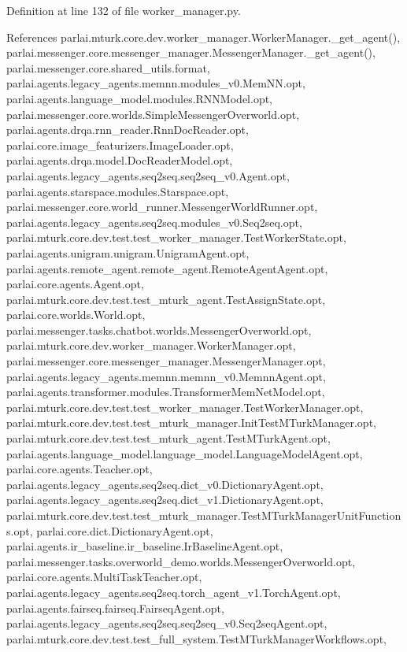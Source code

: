 Definition at line 132 of file worker\+\_\+manager.\+py.



References parlai.\+mturk.\+core.\+dev.\+worker\+\_\+manager.\+Worker\+Manager.\+\_\+get\+\_\+agent(), parlai.\+messenger.\+core.\+messenger\+\_\+manager.\+Messenger\+Manager.\+\_\+get\+\_\+agent(), parlai.\+messenger.\+core.\+shared\+\_\+utils.\+format, parlai.\+agents.\+legacy\+\_\+agents.\+memnn.\+modules\+\_\+v0.\+Mem\+N\+N.\+opt, parlai.\+agents.\+language\+\_\+model.\+modules.\+R\+N\+N\+Model.\+opt, parlai.\+messenger.\+core.\+worlds.\+Simple\+Messenger\+Overworld.\+opt, parlai.\+agents.\+drqa.\+rnn\+\_\+reader.\+Rnn\+Doc\+Reader.\+opt, parlai.\+core.\+image\+\_\+featurizers.\+Image\+Loader.\+opt, parlai.\+agents.\+drqa.\+model.\+Doc\+Reader\+Model.\+opt, parlai.\+agents.\+legacy\+\_\+agents.\+seq2seq.\+seq2seq\+\_\+v0.\+Agent.\+opt, parlai.\+agents.\+starspace.\+modules.\+Starspace.\+opt, parlai.\+messenger.\+core.\+world\+\_\+runner.\+Messenger\+World\+Runner.\+opt, parlai.\+agents.\+legacy\+\_\+agents.\+seq2seq.\+modules\+\_\+v0.\+Seq2seq.\+opt, parlai.\+mturk.\+core.\+dev.\+test.\+test\+\_\+worker\+\_\+manager.\+Test\+Worker\+State.\+opt, parlai.\+agents.\+unigram.\+unigram.\+Unigram\+Agent.\+opt, parlai.\+agents.\+remote\+\_\+agent.\+remote\+\_\+agent.\+Remote\+Agent\+Agent.\+opt, parlai.\+core.\+agents.\+Agent.\+opt, parlai.\+mturk.\+core.\+dev.\+test.\+test\+\_\+mturk\+\_\+agent.\+Test\+Assign\+State.\+opt, parlai.\+core.\+worlds.\+World.\+opt, parlai.\+messenger.\+tasks.\+chatbot.\+worlds.\+Messenger\+Overworld.\+opt, parlai.\+mturk.\+core.\+dev.\+worker\+\_\+manager.\+Worker\+Manager.\+opt, parlai.\+messenger.\+core.\+messenger\+\_\+manager.\+Messenger\+Manager.\+opt, parlai.\+agents.\+legacy\+\_\+agents.\+memnn.\+memnn\+\_\+v0.\+Memnn\+Agent.\+opt, parlai.\+agents.\+transformer.\+modules.\+Transformer\+Mem\+Net\+Model.\+opt, parlai.\+mturk.\+core.\+dev.\+test.\+test\+\_\+worker\+\_\+manager.\+Test\+Worker\+Manager.\+opt, parlai.\+mturk.\+core.\+dev.\+test.\+test\+\_\+mturk\+\_\+manager.\+Init\+Test\+M\+Turk\+Manager.\+opt, parlai.\+mturk.\+core.\+dev.\+test.\+test\+\_\+mturk\+\_\+agent.\+Test\+M\+Turk\+Agent.\+opt, parlai.\+agents.\+language\+\_\+model.\+language\+\_\+model.\+Language\+Model\+Agent.\+opt, parlai.\+core.\+agents.\+Teacher.\+opt, parlai.\+agents.\+legacy\+\_\+agents.\+seq2seq.\+dict\+\_\+v0.\+Dictionary\+Agent.\+opt, parlai.\+agents.\+legacy\+\_\+agents.\+seq2seq.\+dict\+\_\+v1.\+Dictionary\+Agent.\+opt, parlai.\+mturk.\+core.\+dev.\+test.\+test\+\_\+mturk\+\_\+manager.\+Test\+M\+Turk\+Manager\+Unit\+Functions.\+opt, parlai.\+core.\+dict.\+Dictionary\+Agent.\+opt, parlai.\+agents.\+ir\+\_\+baseline.\+ir\+\_\+baseline.\+Ir\+Baseline\+Agent.\+opt, parlai.\+messenger.\+tasks.\+overworld\+\_\+demo.\+worlds.\+Messenger\+Overworld.\+opt, parlai.\+core.\+agents.\+Multi\+Task\+Teacher.\+opt, parlai.\+agents.\+legacy\+\_\+agents.\+seq2seq.\+torch\+\_\+agent\+\_\+v1.\+Torch\+Agent.\+opt, parlai.\+agents.\+fairseq.\+fairseq.\+Fairseq\+Agent.\+opt, parlai.\+agents.\+legacy\+\_\+agents.\+seq2seq.\+seq2seq\+\_\+v0.\+Seq2seq\+Agent.\+opt, parlai.\+mturk.\+core.\+dev.\+test.\+test\+\_\+full\+\_\+system.\+Test\+M\+Turk\+Manager\+Workflows.\+opt, 